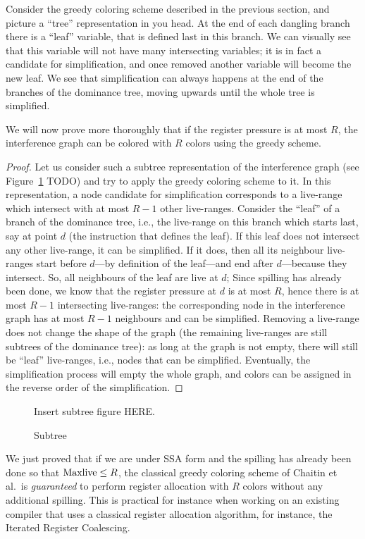{Consider the greedy coloring scheme described in the previous section, and picture a ``tree'' representation in you head.
At the end of each dangling branch there is a ``leaf'' variable, that is defined last in this branch.
We can visually see that this variable will not have many intersecting variables;
it is in fact a candidate for simplification, and once removed another variable will become the new leaf.
We see that simplification can always happens at the end of the branches of the dominance tree, moving upwards until the whole tree is simplified.

We will now prove more thoroughly that if the register pressure is at most $R$, the interference graph can be colored with $R$ colors using the greedy scheme.

\begin{proof}
  Let us consider such a subtree representation of the interference graph (see Figure~\ref{fig:regalloc:subtree} TODO) and try to apply the greedy coloring scheme to it.
  In this representation, a node candidate for simplification corresponds to a live-range which intersect with at most $R-1$ other live-ranges.
  Consider the ``leaf'' of a branch of the dominance tree, i.e., the live-range on this branch which starts last, say at point $d$ (the instruction that defines the leaf).
  If this leaf does not intersect any other live-range, it can be simplified.
  If it does, then all its neighbour live-ranges start before $d$---by definition of the leaf---and end after $d$---because they intersect.
  So, all neighbours of the leaf are live at $d$;
  Since spilling has already been done, we know that the register pressure at $d$ is at most $R$, hence there is at most $R-1$ intersecting live-ranges:
  the corresponding node in the interference graph has at most $R-1$ neighbours and can be simplified.
  Removing a live-range does not change the shape of the graph (the remaining live-ranges are still subtrees of the dominance tree):
  as long at the graph is not empty, there will still be ``leaf'' live-ranges, i.e., nodes that can be simplified.
  Eventually, the simplification process will empty the whole graph, and colors can be assigned in the reverse order of the simplification.
\end{proof}

\begin{figure}
  Insert subtree figure HERE.
  \caption{Subtree}
  \label{fig:regalloc:subtree}
\end{figure}

We just proved that if we are under SSA form and the spilling has already been done so that $\mathrm{Maxlive} \leq R$, the classical greedy coloring scheme of Chaitin et al.\ is \emph{guaranteed} to perform register allocation with $R$ colors without any additional spilling.
This is practical for instance when working on an existing compiler that uses a classical register allocation algorithm, for instance, the Iterated Register Coalescing.


}
